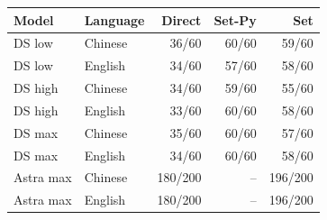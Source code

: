 \begin{tabular}{llrrr}
\toprule
Model & Language & Direct & Set-Py & Set \\
\midrule
DS low & Chinese & 36/60 & 60/60 & 59/60 \\
DS low & English & 34/60 & 57/60 & 58/60 \\
\midrule
DS high & Chinese & 34/60 & 59/60 & 55/60 \\
DS high & English & 33/60 & 60/60 & 58/60 \\
\midrule
DS max & Chinese & 35/60 & 60/60 & 57/60 \\
DS max & English & 34/60 & 60/60 & 58/60 \\
\midrule
Astra max & Chinese & 180/200 & -- & 196/200 \\
Astra max & English & 180/200 & -- & 196/200 \\
\bottomrule
\end{tabular}

